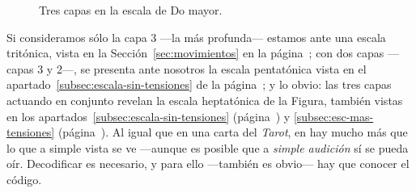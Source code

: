 \documentclass[a4paper,11pt]{article}
\begin{document}
  \begin{figure}[ht]
  \centering
  \caption{Tres capas en la escala de Do mayor.}\label{fig:capas-escala}
  \end{figure}

\begin{multicols}{2}

\noindent Si consideramos sólo la capa 3 ---la más profunda--- estamos ante una escala tritónica, vista en la Sección~\ref{sec:movimientos} en la página~\pageref{sec:movimientos}; con dos capas ---capas 3 y 2---, se presenta ante nosotros la escala pentatónica vista en el apartado~\ref{subsec:escala-sin-tensiones} de la página~\pageref{subsec:escala-sin-tensiones}; y lo obvio: las tres capas actuando en conjunto revelan la escala heptatónica de la Figura, también vistas en los apartados~\ref{subsec:escala-sin-tensiones} (página~\pageref{subsec:escala-sin-tensiones}) y \ref{subsec:esc-mas-tensiones} (página~\pageref{subsec:esc-mas-tensiones}). Al igual que en una carta del \emph{Tarot}, en  hay mucho más que lo que a simple vista se ve ---aunque es posible que a \emph{simple audición} sí se pueda oír. Decodificar es necesario, y para ello ---también es obvio--- hay que conocer el código.
\end{multicols}
\end{document}
